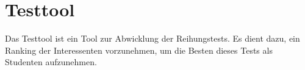 \chapter{Testtool}

Das Testtool ist ein Tool zur Abwicklung der Reihungstests. Es dient dazu, ein Ranking der Interessenten  vorzunehmen, um die Besten dieses Tests als Studenten aufzunehmen.

